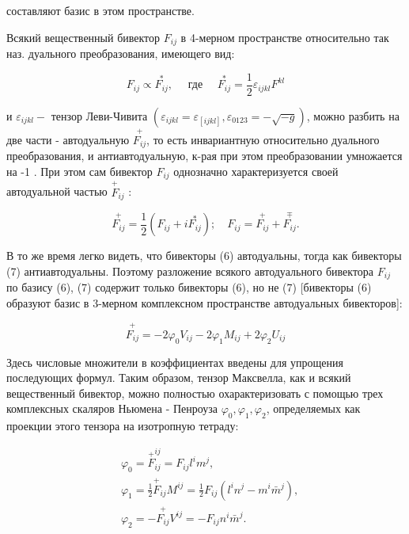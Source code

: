 \documentclass[10pt]{article}
\begin{document}
составляют базис в этом пространстве.



Всякий вещественный бивектор $F_{i j}$ в 4-мерном пространстве относительно так наз. дуального преобразования, имеющего вид:



\[

F_{i j} \propto \stackrel{*}{F_{i j}}, \quad \text { где } \quad \stackrel{*}{F_{i j}}=\frac{1}{2} \varepsilon_{i j k l} F^{k l}

\]



и $\varepsilon_{i j k l}-$ тензор Леви-Чивита $\left(\varepsilon_{i j k l}=\varepsilon_{[i j k l]}, \varepsilon_{0123}=-\sqrt{-g}\right)$, можно разбить на две части - автодуальную $\stackrel{+}{F_{i j}}$, то есть инвариантную относительно дуального преобразования, и антиавтодуальную, к-рая при этом преобразовании умножается на -1 . При этом сам бивектор $F_{i j}$ однозначно характеризуется своей автодуальной частью $\stackrel{+}{F}_{i j}$ :



\[

\stackrel{+}{F_{i j}}=\frac{1}{2}\left(F_{i j}+i \stackrel{*}{F_{i j}}\right) ; \quad F_{i j}=\stackrel{+}{F_{i j}}+\stackrel{\mp}{F_{i j}} .

\]



В то же время легко видеть, что бивекторы (6) автодуальны, тогда как бивекторы (7) антиавтодуальны. Поэтому разложение всякого автодуального бивектора $F_{i j}$ по базису (6), (7) содержит только бивекторы (6), но не (7) [бивекторы (6) образуют базис в 3-мерном комплексном пространстве автодуальных бивекторов]:



\[

\stackrel{+}{F_{i j}}=-2 \varphi_{0} V_{i j}-2 \varphi_{1} M_{i j}+2 \varphi_{2} U_{i j}

\]



Здесь числовые множители в коэффициентах введены для упрощения последующих формул. Таким образом, тензор Максвелла, как и всякий вещественный бивектор, можно полностью охарактеризовать с помощью трех комплексных скаляров Ньюмена - Пенроуза $\varphi_{0}, \varphi_{1}, \varphi_{2}$, определяемых как проекции этого тензора на изотропную тетраду:



\[

\begin{aligned}

& \varphi_{0}=\stackrel{+}{F}_{i j}^{i j}=F_{i j} l^{i} m^{j}, \\

& \varphi_{1}=\frac{1}{2} \stackrel{+}{F}_{i j} M^{i j}=\frac{1}{2} F_{i j}\left(l^{i} n^{j}-m^{i} \bar{m}^{j}\right), \\

& \varphi_{2}=-\stackrel{+}{F_{i j}} V^{i j}=-F_{i j} n^{i} \bar{m}^{j} .

\end{aligned}

\]
\end{document}
